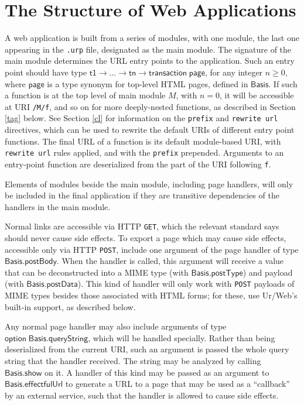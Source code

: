 \documentclass{article}
\newcommand{\mt}[1]{\mathsf{#1}}
\begin{document}
\section{\label{structure}The Structure of Web Applications}

A web application is built from a series of modules, with one module, the last one appearing in the \texttt{.urp} file, designated as the main module.  The signature of the main module determines the URL entry points to the application.  Such an entry point should have type $\mt{t1} \to \ldots \to \mt{tn} \to \mt{transaction} \; \mt{page}$, for any integer $n \geq 0$, where $\mt{page}$ is a type synonym for top-level HTML pages, defined in $\mt{Basis}$.  If such a function is at the top level of main module $M$, with $n = 0$, it will be accessible at URI \texttt{/M/f}, and so on for more deeply-nested functions, as described in Section \ref{tag} below.  See Section \ref{cl} for information on the \texttt{prefix} and \texttt{rewrite url} directives, which can be used to rewrite the default URIs of different entry point functions.  The final URL of a function is its default module-based URI, with \texttt{rewrite url} rules applied, and with the \texttt{prefix} prepended.  Arguments to an entry-point function are deserialized from the part of the URI following \texttt{f}.

Elements of modules beside the main module, including page handlers, will only be included in the final application if they are transitive dependencies of the handlers in the main module.

Normal links are accessible via HTTP \texttt{GET}, which the relevant standard says should never cause side effects.  To export a page which may cause side effects, accessible only via HTTP \texttt{POST}, include one argument of the page handler of type $\mt{Basis.postBody}$.  When the handler is called, this argument will receive a value that can be deconstructed into a MIME type (with $\mt{Basis.postType}$) and payload (with $\mt{Basis.postData}$).  This kind of handler will only work with \texttt{POST} payloads of MIME types besides those associated with HTML forms; for these, use Ur/Web's built-in support, as described below.

Any normal page handler may also include arguments of type $\mt{option \; Basis.queryString}$, which will be handled specially.  Rather than being deserialized from the current URI, such an argument is passed the whole query string that the handler received.  The string may be analyzed by calling $\mt{Basis.show}$ on it.  A handler of this kind may be passed as an argument to $\mt{Basis.effectfulUrl}$ to generate a URL to a page that may be used as a ``callback'' by an external service, such that the handler is allowed to cause side effects.
\end{document}
